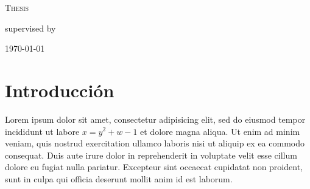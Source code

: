 \documentclass[12pt,letter]{book}
\begin{document}
\makeatletter
\begin{titlepage}
\begin{figure}
\vspace{-4.5cm}
\end{figure}
    \centering
    \vspace*{2cm}
    {\scshape\Large Thesis\par}
    \vspace{1.5cm}
    {\huge\bfseries \@title\par}
    \vspace{2cm}
    {\Large\itshape \@author \par}
    \vfill
    supervised by\par
    \supervisor

    \vfill

    {\large \today\par}

\end{titlepage}
\makeatother



\chapter{Introducción}
Lorem ipsum dolor sit amet, consectetur adipisicing elit, sed do eiusmod
tempor incididunt ut labore $x = y^2 + w - 1$ et dolore magna aliqua. Ut enim ad minim veniam, quis nostrud exercitation ullamco laboris nisi ut aliquip ex ea commodo
consequat. Duis aute irure dolor in reprehenderit in voluptate velit esse
cillum dolore eu fugiat nulla pariatur. Excepteur sint occaecat cupidatat non
proident, sunt in culpa qui officia deserunt mollit anim id est laborum.
\end{document}

